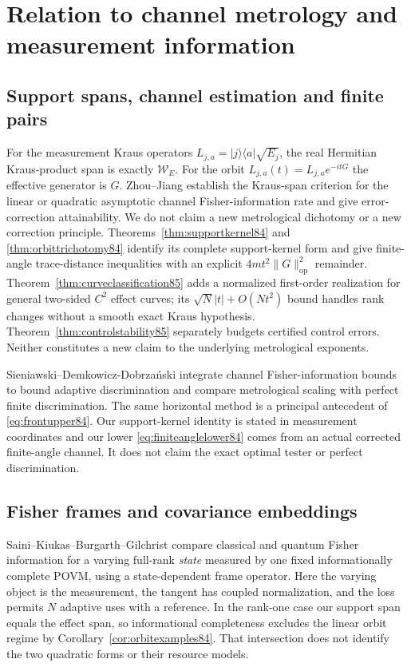 \section{Relation to channel metrology and measurement information}
\label{sec:comparison84}

\subsection{Support spans, channel estimation and finite pairs}
For the measurement Kraus operators
$L_{j,a}=|j\rangle\langle a|\sqrt{E_j}$, the real Hermitian
Kraus-product span is exactly $\mathcal W_E$.  For the orbit
$L_{j,a}(t)=L_{j,a}e^{-itG}$ the effective generator is $G$.
Zhou--Jiang \cite[Theorems~1--3 and Section~V]{ZJ84} establish the
Kraus-span criterion for the linear or quadratic asymptotic channel
Fisher-information rate and give error-correction attainability.
We do not claim a new metrological dichotomy or a new correction
principle.  Theorems~\ref{thm:supportkernel84} and
\ref{thm:orbittrichotomy84} identify its complete support-kernel
form and give finite-angle trace-distance inequalities with an
explicit $4mt^2\|G\|_{\mathrm{op}}^2$ remainder.
Theorem~\ref{thm:curveclassification85} adds a normalized first-order
realization for general two-sided $C^2$ effect curves; its
$\sqrt N|t|+O(Nt^2)$ bound handles rank changes without a smooth
exact Kraus hypothesis.  Theorem~\ref{thm:controlstability85} separately
budgets certified control errors.  Neither constitutes a new claim
to the underlying metrological exponents.

Sieniawski--Demkowicz-Dobrza\'nski
\cite[Section~IV, equations~(16)--(23)]{SD76} integrate channel
Fisher-information bounds to bound adaptive discrimination and
compare metrological scaling with perfect finite discrimination.
The same horizontal method is a principal antecedent of
\eqref{eq:frontupper84}.  Our support-kernel identity is stated in
measurement coordinates and our lower \eqref{eq:finiteanglelower84}
comes from an actual corrected finite-angle channel.  It does not
claim the exact optimal tester or perfect discrimination.

\subsection{Fisher frames and covariance embeddings}
Saini--Kiukas--Burgarth--Gilchrist \cite[Theorem~1]{SKBG84} compare
classical and quantum Fisher information for a varying full-rank
\emph{state} measured by one fixed informationally complete POVM,
using a state-dependent frame operator.  Here the varying object
is the measurement, the tangent has coupled normalization, and the
loss permits $N$ adaptive uses with a reference.  In the rank-one
case our support span equals the effect span, so informational
completeness excludes the linear orbit regime by
Corollary~\ref{cor:orbitexamples84}.  That intersection does not
identify the two quadratic forms or their resource models.

